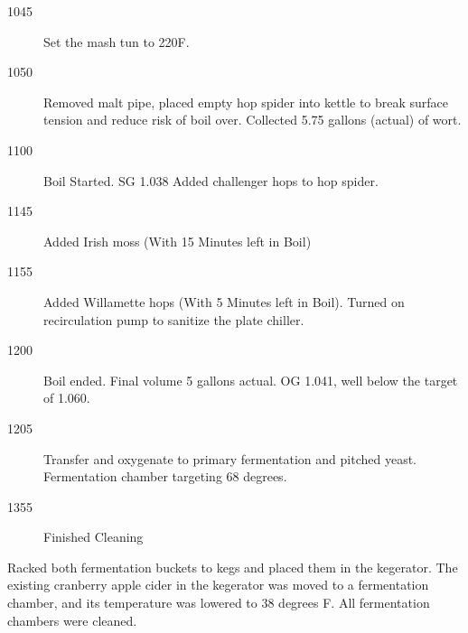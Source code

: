 \begin{description}
    \item[1045] Set the mash tun to 220F.
    \item[1050] Removed malt pipe, placed empty hop spider into kettle to break surface tension and reduce risk of boil over.  Collected 5.75 gallons (actual) of wort.
    \item[1100] Boil Started. SG 1.038 Added challenger hops to hop spider.
    \item[1145] Added Irish moss (With 15 Minutes left in Boil)
    \item[1155] Added Willamette hops (With 5 Minutes left in Boil).  Turned on recirculation pump to sanitize the plate chiller.
    \item[1200] Boil ended. Final volume 5 gallons actual. OG 1.041, well below the target of 1.060.
    \item[1205] Transfer and oxygenate to primary fermentation and pitched yeast.  Fermentation chamber targeting 68 degrees.
    \item[1355] Finished Cleaning
\end{description}

\def\todaysdate{20210801}
\newday{\todaysdate}\label{\todaysdate}


Racked both fermentation buckets to kegs and placed them in the kegerator.  The existing cranberry apple cider in the kegerator was moved to a fermentation chamber, and its temperature was lowered to 38 degrees F.  All fermentation chambers were cleaned.
